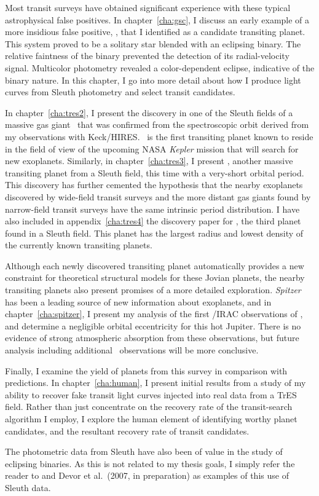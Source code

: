 Most transit surveys have obtained significant experience with these typical astrophysical false positives.
In chapter~\ref{cha:gsc}, I discuss an early example of a more insidious false positive, \gscOTE, that I identified as a candidate transiting planet.
This system proved to be a solitary star blended with an eclipsing binary.
The relative faintness of the binary prevented the detection of its radial-velocity signal.
Multicolor photometry revealed a color-dependent eclipse, indicative of the binary nature.
In this chapter, I go into more detail about how I produce light curves from Sleuth photometry and select transit candidates.

In chapter~\ref{cha:tres2}, I present the discovery in one of the Sleuth fields of a massive gas giant \tresTwo\ that was confirmed from the spectroscopic orbit derived from my observations with Keck/HIRES.
\tresTwo\ is the first transiting planet known to reside in the field of view of the upcoming NASA {\it Kepler} mission that will search for new exoplanets.
Similarly, in chapter~\ref{cha:tres3}, I present \tresThree, another massive transiting planet from a Sleuth field, this time with a very-short orbital period.
This discovery has further cemented the hypothesis that the nearby exoplanets discovered by wide-field transit surveys and the more distant gas giants found by narrow-field transit surveys have the same intrinsic period distribution.
I have also included in appendix~\ref{cha:tres4} the discovery paper for \tresFour, the third planet found in a Sleuth field.
This planet has the largest radius and lowest density of the currently known transiting planets.

Although each newly discovered transiting planet automatically provides a new constraint for theoretical structural models for these Jovian planets, the nearby transiting planets also present promises of a more detailed exploration.
{\it Spitzer} has been a leading source of new information about exoplanets, and in chapter~\ref{cha:spitzer}, I present my analysis of the first \spi/IRAC observations of \tresTwo, and determine a negligible orbital eccentricity for this hot Jupiter. There is no evidence of strong atmospheric absorption from these observations, but future analysis including additional \spi\ observations will be more conclusive.

Finally, I examine the yield of planets from this survey in comparison with predictions.
In chapter~\ref{cha:human}, I present initial results from a study of my ability to recover fake transit light curves injected into real data from a TrES field.
Rather than just concentrate on the recovery rate of the transit-search algorithm I employ, I explore the human element of identifying worthy planet candidates, and the resultant recovery rate of transit candidates.

The photometric data from Sleuth have also been of value in the study of eclipsing binaries. As this is not related to my thesis goals, I simply refer the reader to \citet{Creevey_Benedict_Brown:apjl:2005a} and Devor et al.~(2007, in preparation) as examples of this use of Sleuth data.
